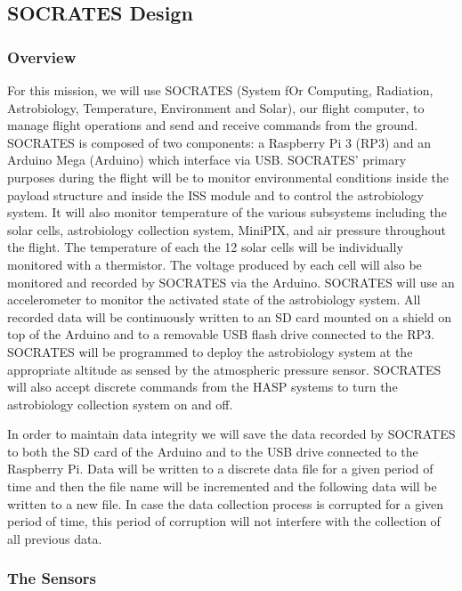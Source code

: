 \subsection{SOCRATES Design}
\label{sec:ElectronicsDesign}

\subsubsection{Overview}

For this mission, we will use SOCRATES (System fOr Computing, Radiation, Astrobiology, Temperature, Environment and Solar), our flight computer, to manage flight operations and send and receive commands from the ground. SOCRATES is composed of two components: a Raspberry Pi 3 (RP3) and an Arduino Mega (Arduino) which interface via USB. SOCRATES' primary purposes during the flight will be to monitor environmental conditions inside the payload structure and inside the ISS module and to control the astrobiology system. It will also monitor temperature of the various subsystems including the solar cells, astrobiology collection system, MiniPIX, and air pressure throughout the flight. The temperature of each the 12 solar cells will be individually monitored with a thermistor. The voltage produced by each cell will also be monitored and recorded by SOCRATES via the Arduino. SOCRATES will use an accelerometer to monitor the activated state of the astrobiology system. All recorded data will be continuously written to an SD card mounted on a shield on top of the Arduino and to a removable USB flash drive connected to the RP3. SOCRATES will be programmed to deploy the astrobiology system at the appropriate altitude as sensed by the atmospheric pressure sensor. SOCRATES will also accept discrete commands from the HASP systems to turn the astrobiology collection system on and off.

In order to maintain data integrity we will save the data recorded by SOCRATES to both the SD card of the Arduino and to the USB drive connected to the Raspberry Pi. Data will be written to a discrete data file for a given period of time and then the file name will be incremented and the following data will be written to a new file. In case the data collection process is corrupted for a given period of time, this period of corruption will not interfere with the collection of all previous data. 

\subsubsection{The Sensors}

